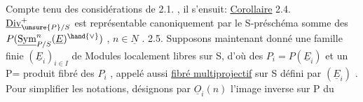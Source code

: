 Compte tenu des considérations de 2.1. , il s'ensuit:
\uline{Corollaire} 2.4. $\underline{\mathrm{Div}}^{+}_{\unsure{P}/S}$ est représentable canoniquement  par
le S-préschéma somme des $P(\underline{\mathrm{Sym}}^{n}_{P/S}(\underline{E})^{\hand{\vee}})$ , $n \in \underline{N}$ .
2.5. Supposons maintenant donné une famille finie $(\underline{E}_i)_{i \in I}$ de Modules
localement libres sur S, d'où des $P_i = P(\underline{E}_i)$ et un P= produit fibré des
$P_i$ , appelé aussi \uline{fibré multiprojectif} sur S défini par $(\underline{E}_i)$ . Pour
simplifier les notations, désignons par $\underline{O}_i(n)$ l'image inverse sur P du

